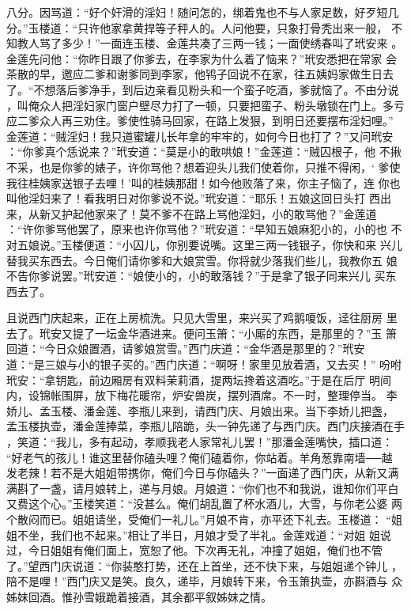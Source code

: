八分。因骂道：“好个奸滑的淫妇！随问怎的，绑着鬼也不与人家足数，好歹短几
分。”玉楼道：“只许他家拿黄捍等子秤人的。人问他要，只象打骨秃出来一般，
不知教人骂了多少！”一面连玉楼、金莲共凑了三两一钱；一面使绣春叫了玳安来
。金莲先问他：“你昨日跟了你爹去，在李家为什么着了恼来？”玳安悉把在常家
会茶散的早，邀应二爹和谢爹同到李家，他鸨子回说不在家，往五姨妈家做生日去
了。“不想落后爹净手，到后边亲看见粉头和一个蛮子吃酒，爹就恼了。不由分说
，叫俺众人把淫妇家门窗户壁尽力打了一顿，只要把蛮子、粉头墩锁在门上。多亏
应二爹众人再三劝住。爹使性骑马回家，在路上发狠，到明日还要摆布淫妇哩。”
金莲道：“贼淫妇！我只道蜜罐儿长年拿的牢牢的，如何今日也打了？”又问玳安
：“你爹真个恁说来？”玳安道：“莫是小的敢哄娘！”金莲道：“贼囚根子，他
不揪不采，也是你爹的婊子，许你骂他？想着迎头儿我们使着你，只推不得闲，‘
爹使我往桂姨家送银子去哩！’叫的桂姨那甜！如今他败落了来，你主子恼了，连
你也叫他淫妇来了！看我明日对你爹说不说。”玳安道：“耶乐！五娘这回日头打
西出来，从新又护起他家来了！莫不爹不在路上骂他淫妇，小的敢骂他？”金莲道
：“许你爹骂他罢了，原来也许你骂他？”玳安道：“早知五娘麻犯小的，小的也
不对五娘说。”玉楼便道：“小囚儿，你别要说嘴。这里三两一钱银子，你快和来
兴儿替我买东西去。今日俺们请你爹和大娘赏雪。你将就少落我们些儿，我教你五
娘不告你爹说罢。”玳安道：“娘使小的，小的敢落钱？”于是拿了银子同来兴儿
买东西去了。

且说西门庆起来，正在上房梳洗。只见大雪里，来兴买了鸡鹅嗄饭，迳往厨房
里去了。玳安又提了一坛金华酒进来。便问玉箫：“小厮的东西，是那里的？”玉
箫回道：“今日众娘置酒，请爹娘赏雪。”西门庆道：“金华酒是那里的？”玳安
道：“是三娘与小的银子买的。”西门庆道：“啊呀！家里见放着酒，又去买！”
吩咐玳安：“拿钥匙，前边厢房有双料茉莉酒，提两坛搀着这酒吃。”于是在后厅
明间内，设锦帐围屏，放下梅花暖帘，炉安兽炭，摆列酒席。不一时，整理停当。
李娇儿、孟玉楼、潘金莲、李瓶儿来到，请西门庆、月娘出来。当下李娇儿把盏，
孟玉楼执壶，潘金莲捧菜，李瓶儿陪跪，头一钟先递了与西门庆。西门庆接酒在手
，笑道：“我儿，多有起动，孝顺我老人家常礼儿罢！”那潘金莲嘴快，插口道：
“好老气的孩儿！谁这里替你磕头哩？俺们磕着你，你站着。羊角葱靠南墙──越
发老辣！若不是大姐姐带携你，俺们今日与你磕头？”一面递了西门庆，从新又满
满斟了一盏，请月娘转上，递与月娘。月娘道：“你们也不和我说，谁知你们平白
又费这个心。”玉楼笑道：“没甚么。俺们胡乱置了杯水酒儿，大雪，与你老公婆
两个散闷而已。姐姐请坐，受俺们一礼儿。”月娘不肯，亦平还下礼去。玉楼道：
“姐姐不坐，我们也不起来。”相让了半日，月娘才受了半礼。金莲戏道：“对姐
姐说过，今日姐姐有俺们面上，宽恕了他。下次再无礼，冲撞了姐姐，俺们也不管
了。”望西门庆说道：“你装憨打势，还在上首坐，还不快下来，与姐姐递个钟儿
，陪不是哩！”西门庆又是笑。良久，递毕，月娘转下来，令玉箫执壶，亦斟酒与
众姊妹回酒。惟孙雪娥跪着接酒，其余都平叙姊妹之情。

